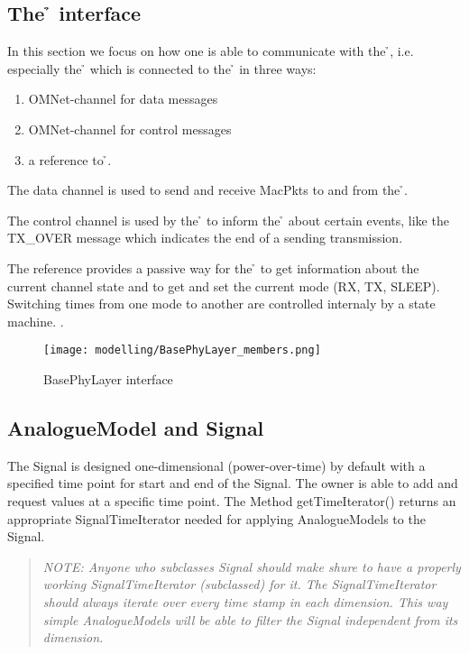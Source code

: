 \subsection{The \h{\bp} interface}

In this section we focus on how one is able to communicate with the 
\h{\bp}, i.e. especially the \h{\bm} which is connected to the \h{\bp}
in three ways:

\begin{enumerate}
 \item OMNet-channel for data messages
 \item OMNet-channel for control messages
 \item a reference to \h{\bp}.
\end{enumerate} 

The data channel is used to send and receive MacPkts to and from the \h{\bp}.

The control channel is used by the \h{\bp} to inform the \h{\bm} about
certain events, like the TX\_OVER message 
which indicates the end of a sending transmission.

The reference provides a passive way for the  \h{\bm} to  get information about the current channel state and to get and set the current mode (RX, TX, SLEEP).
Switching times from one mode to another are controlled internaly by a state machine. .


\begin{figure}[H]
 \centering
 \texttt{[image: modelling/BasePhyLayer\_members.png]}
 \caption{BasePhyLayer interface}
 \label{fig: BasePhyLayer interface}
\end{figure}



\subsection{AnalogueModel and Signal}
\label{AM and Signal}

The Signal is designed one-dimensional (power-over-time) by default with a specified time point for start and end of the Signal. The owner is able
to add and request values at a specific time point.
The Method getTimeIterator() returns an appropriate SignalTimeIterator needed for applying AnalogueModels to the Signal.

\begin{quote}
\emph{NOTE: Anyone who subclasses Signal should make shure to have a properly
working SignalTimeIterator (subclassed) for it. The SignalTimeIterator should always iterate over every time stamp in each dimension. This way simple AnalogueModels will be able to filter the Signal independent from its dimension.}
\end{quote}

